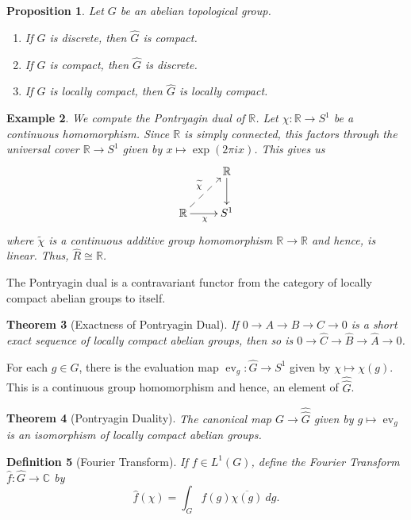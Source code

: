 \documentclass[12pt]{article}
\theoremstyle{thmstyle}
\newtheorem{theorem}{Theorem}[section]
\newtheorem{proposition}[theorem]{Proposition}
\theoremstyle{defstyle}
\newtheorem{definition}[theorem]{Definition}
\newtheorem{example}[theorem]{Example}
\newcommand{\R}{\mathbb{R}}
\newcommand{\bbC}{\mathbb{C}}
\newcommand{\wt}[1]{\widetilde{#1}}
\newcommand{\wh}[1]{\widehat{#1}}
\newcommand{\ev}{\operatorname{ev}}
\begin{document}
\begin{proposition}
    Let $G$ be an abelian topological group. 
    \begin{enumerate}[label=(\alph*)]
        \item If $G$ is discrete, then $\wh G$ is compact.
        \item If $G$ is compact, then $\wh G$ is discrete. 
        \item If $G$ is locally compact, then $\wh G$ is locally compact.
    \end{enumerate}
\end{proposition}

\begin{example}
    We compute the Pontryagin dual of $\R$. Let $\chi: \R\to S^1$ be a continuous homomorphism. Since $\R$ is simply connected, this factors through the universal cover $\R\to S^1$ given by $x\mapsto\exp(2\pi i x)$. This gives us 
    \begin{equation*}
        \xymatrix {
            & \R\ar[d]\\
            \R\ar[r]_{\chi}\ar@{-->}[ru]^{\wt\chi} & S^1
        }
    \end{equation*}
    where $\wt\chi$ is a continuous additive group homomorphism $\R\to\R$ and hence, is linear. Thus, $\wh R\cong\R$.
\end{example}

The Pontryagin dual is a contravariant functor from the category of locally compact abelian groups to itself. 

\begin{theorem}[Exactness of Pontryagin Dual]
    If $0\to A\to B\to C\to 0$ is a short exact sequence of locally compact abelian groups, then so is $0\to\wh C\to\wh B\to\wh A\to 0$.
\end{theorem}

For each $g\in G$, there is the evaluation map $\ev_g: \wh G\to S^1$ given by $\chi\mapsto \chi(g)$. This is a continuous group homomorphism and hence, an element of $\wh{\wh G}$.

\begin{theorem}[Pontryagin Duality]
    The canonical map $G\to\wh{\wh G}$ given by $g\mapsto\ev_g$ is an isomorphism of locally compact abelian groups.
\end{theorem}

\begin{definition}[Fourier Transform]
    If $f\in L^1(G)$, define the \emph{Fourier Transform} $\wh f:\wh G\to\bbC$ by 
    \begin{equation*}
        \wh f(\chi) = \int_G f(g)\overline{\chi(g)}~dg.
    \end{equation*}
\end{definition}
\end{document}
